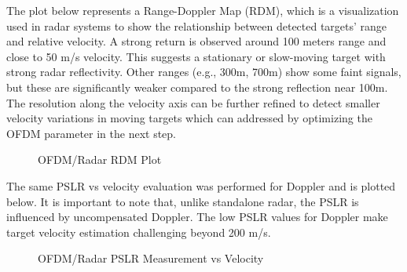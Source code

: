 \documentclass[conference]{IEEEtran}
\begin{document}
The plot below represents a Range-Doppler Map (RDM), which is a visualization used in radar systems to show the relationship between detected targets' range and relative velocity. A strong return is observed around 100 meters range and close to 50 m/s velocity. This suggests a stationary or slow-moving target with strong radar reflectivity. Other ranges (e.g., 300m, 700m) show some faint signals, but these are significantly weaker compared to the strong reflection near 100m. The resolution along the velocity axis can be further refined to detect smaller velocity variations in moving targets which can addressed by optimizing the OFDM parameter in the next step. 
\begin{figure}[H]
\centering
{}
\caption{OFDM/Radar RDM Plot}
\end{figure} 
The same PSLR vs velocity evaluation was performed for Doppler and is plotted below. It is important to note that, unlike standalone radar, the PSLR is influenced by uncompensated Doppler. The low PSLR values for Doppler make target velocity estimation challenging beyond 200 m/s.
\begin{figure}[H]
\centering
{}
\caption{OFDM/Radar PSLR Measurement vs Velocity}
\end{figure} 
\end{document}
